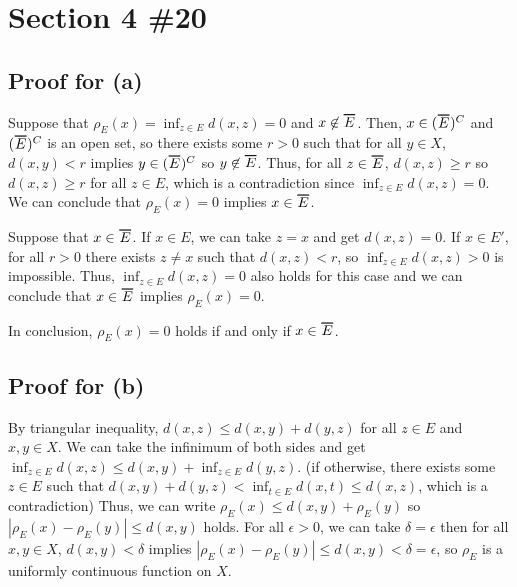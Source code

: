\documentclass{scrartcl}
\newcommand\Overline[2][0.8pt]{%
  \begin{tikzpicture}[baseline=(a.base)]
    \node[inner xsep=0pt,inner ysep=1.5pt] (a) {$#2$};
    \draw[line width= #1] (a.north west) -- (a.north east);
  \end{tikzpicture}
}
\begin{document}
\section{Section 4 \#20}
\subsection{Proof for (a)}
Suppose that \(\rho_E(x) = \inf_{z \in E} d(x, z) = 0\) and \(x \not \in \Overline{E}\).
Then, \(x \in (\Overline{E})^C\) and \((\Overline{E})^C\) is an open set, so there exists some \(r > 0\) such that for all \(y \in X\), \(d(x, y) < r\) implies \(y \in (\Overline{E})^C\) so \(y \not \in \Overline{E}\).
Thus, for all \(z \in \Overline{E}\), \(d(x, z) \geq r\) so \(d(x, z) \geq r\) for all \(z \in E\), which is a contradiction since \(\inf_{z \in E} d(x, z) = 0\).
We can conclude that \(\rho_E(x) = 0\) implies \(x \in \Overline{E}\).

Suppose that \(x \in \Overline{E}\).
If \(x \in E\), we can take \(z = x\) and get \(d(x, z) = 0\).
If \(x \in E'\), for all \(r > 0\) there exists \(z \not = x\) such that \(d(x, z) < r\), so \(\inf_{z \in E} d(x, z) > 0\) is impossible.
Thus, \(\inf_{z \in E} d(x, z) = 0\) also holds for this case and we can conclude that \(x \in \Overline{E}\) implies \(\rho_E(x) = 0\).

In conclusion, \(\rho_E(x) = 0\) holds if and only if \(x \in \Overline{E}\).

\subsection{Proof for (b)}
By triangular inequality, \(d(x, z) \leq d(x, y) + d(y, z)\) for all \(z \in E\) and \(x, y \in X\).
We can take the infinimum of both sides and get \(\inf_{z \in E} d(x, z) \leq d(x, y) + \inf_{z \in E} d(y, z)\).
(if otherwise, there exists some \(z \in E\) such that \(d(x, y) + d(y, z) < \inf_{t \in E} d(x, t) \leq d(x, z)\), which is a contradiction)
Thus, we can write \(\rho_E(x) \leq d(x, y) + \rho_E(y)\) so \(|\rho_E(x) - \rho_E(y)| \leq d(x, y)\) holds.
For all \(\epsilon > 0\), we can take \(\delta = \epsilon\) then for all \(x, y \in X\), \(d(x, y) < \delta\) implies \(|\rho_E(x) - \rho_E(y)| \leq d(x, y) < \delta = \epsilon\), so \(\rho_E\) is a uniformly continuous function on \(X\).
\end{document}
